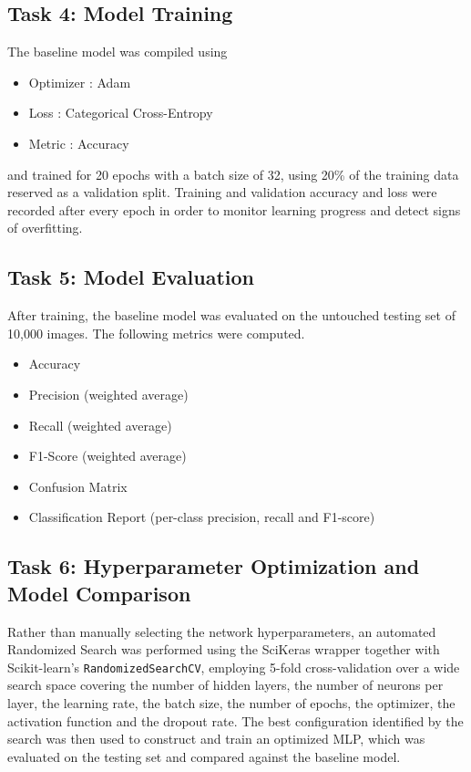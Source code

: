 \documentclass[11pt,a4paper]{article}
\begin{document}
\subsection*{Task 4: Model Training}

The baseline model was compiled using

\begin{itemize}
\item Optimizer : Adam
\item Loss : Categorical Cross-Entropy
\item Metric : Accuracy
\end{itemize}

and trained for 20 epochs with a batch size of 32, using 20\% of the training data reserved as a validation split. Training and validation accuracy and loss were recorded after every epoch in order to monitor learning progress and detect signs of overfitting.


\subsection*{Task 5: Model Evaluation}

After training, the baseline model was evaluated on the untouched testing set of 10{,}000 images. The following metrics were computed.

\begin{itemize}
\item Accuracy
\item Precision (weighted average)
\item Recall (weighted average)
\item F1-Score (weighted average)
\item Confusion Matrix
\item Classification Report (per-class precision, recall and F1-score)
\end{itemize}


\subsection*{Task 6: Hyperparameter Optimization and Model Comparison}

Rather than manually selecting the network hyperparameters, an automated Randomized Search was performed using the SciKeras wrapper together with Scikit-learn's \texttt{RandomizedSearchCV}, employing 5-fold cross-validation over a wide search space covering the number of hidden layers, the number of neurons per layer, the learning rate, the batch size, the number of epochs, the optimizer, the activation function and the dropout rate. The best configuration identified by the search was then used to construct and train an optimized MLP, which was evaluated on the testing set and compared against the baseline model.
\end{document}

